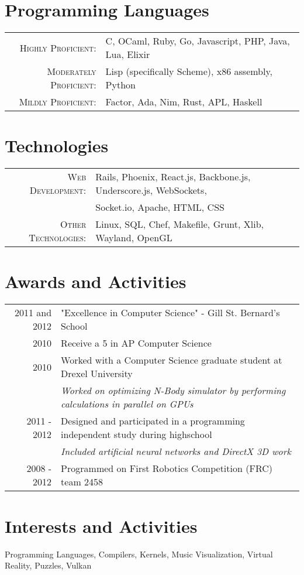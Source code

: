 \documentclass[a4paper,10pt]{article}
\begin{document}
\section{Programming Languages}
\begin{tabular}{rl}
  \textsc{Highly Proficient:}     & C, OCaml, Ruby, Go, Javascript, PHP, Java, Lua, Elixir\\
  \textsc{Moderately Proficient:} & Lisp (specifically Scheme), x86 assembly, Python\\
  \textsc{Mildly Proficient:}     & Factor, Ada, Nim, Rust, APL, Haskell\\
\end{tabular}

\section{Technologies}
\begin{tabular}{rl}
  \textsc{Web Development:}    & Rails, Phoenix, React.js, Backbone.js, Underscore.js, WebSockets,\\
                               & Socket.io, Apache, HTML, CSS\\
  \textsc{Other Technologies:} & Linux, SQL, Chef, Makefile, Grunt, Xlib, Wayland, OpenGL\\
\end{tabular}

\section{Awards and Activities}
\begin{tabular}{rl}	
  2011 and 2012 & "Excellence in Computer Science" - Gill St. Bernard's School\\
  2010          & Receive a 5 in AP Computer Science\\
  2010          & Worked with a Computer Science graduate student at Drexel University\\
                & \emph{Worked on optimizing N-Body simulator by performing calculations in parallel on GPUs}\\
  2011 - 2012   & Designed and participated in a programming independent study during highschool\\
                & \emph{Included artificial neural networks and DirectX 3D work}\\
  2008 - 2012   & Programmed on First Robotics Competition (FRC) team 2458\\
\end{tabular}

\section{Interests and Activities}
Programming Languages, Compilers, Kernels, Music Visualization, Virtual Reality, Puzzles, Vulkan\\


\end{document}

